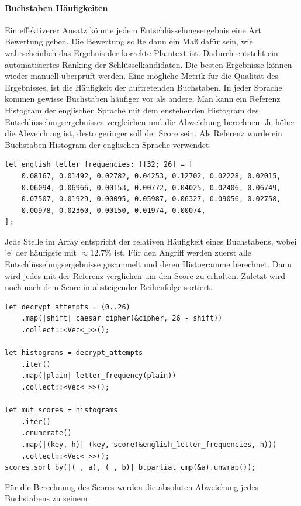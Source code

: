 \documentclass{article}
\begin{document}
    \paragraph{Buchstaben Häufigkeiten} Ein effektiverer Ansatz könnte jedem Entschlüsselungsergebnis
    eine Art Bewertung geben. Die Bewertung sollte dann ein Maß dafür sein, wie wahrscheinlich das Ergebnis
    der korrekte Plaintext ist. Dadurch entsteht ein automatisiertes Ranking der Schlüsselkandidaten.
    Die besten Ergebnisse können wieder manuell überprüft werden. Eine mögliche Metrik für
    die Qualität des Ergebnisses, ist die Häufigkeit der auftretenden Buchstaben. In jeder Sprache
    kommen gewisse Buchstaben häufiger vor als andere. Man kann ein Referenz Histogram der
    englischen Sprache mit dem enstehenden Histogram des Entschlüsselungsergebnisses vergleichen
    und die Abweichung berechnen. Je höher die Abweichung ist, desto geringer soll der 
    Score sein. Als Referenz wurde ein Buchstaben Histogram der englischen Sprache verwendet.
    \begin{verbatim}
let english_letter_frequencies: [f32; 26] = [
    0.08167, 0.01492, 0.02782, 0.04253, 0.12702, 0.02228, 0.02015, 
    0.06094, 0.06966, 0.00153, 0.00772, 0.04025, 0.02406, 0.06749, 
    0.07507, 0.01929, 0.00095, 0.05987, 0.06327, 0.09056, 0.02758, 
    0.00978, 0.02360, 0.00150, 0.01974, 0.00074,
];
    \end{verbatim}
    
    Jede Stelle im Array entspricht der relativen Häufigkeit eines Buchstabens, wobei
    'e' der häufigste mit $\approx 12.7\%$ ist.
    Für den Angriff werden zuerst alle Entschlüsselungsergebnisse gesammelt und deren Histogramme berechnet.
    Dann wird jedes mit der Referenz verglichen um den Score zu erhalten. Zuletzt
    wird noch nach dem Score in absteigender Reihenfolge sortiert.\newpage
    \begin{verbatim}
let decrypt_attempts = (0..26)
    .map(|shift| caesar_cipher(&cipher, 26 - shift))
    .collect::<Vec<_>>();

let histograms = decrypt_attempts
    .iter()
    .map(|plain| letter_frequency(plain))
    .collect::<Vec<_>>();

let mut scores = histograms
    .iter()
    .enumerate()
    .map(|(key, h)| (key, score(&english_letter_frequencies, h)))
    .collect::<Vec<_>>();
scores.sort_by(|(_, a), (_, b)| b.partial_cmp(&a).unwrap());
    \end{verbatim}\vspace*{-1em}
    Für die Berechnung des Scores werden die absoluten Abweichung jedes Buchstabens zu seinem
\end{document}
